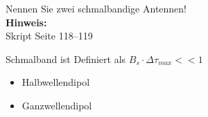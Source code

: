 \begin{question}[section=11,name={Schmalbandantennen},difficulty=,quantity=4,type=thr,tags={20130513}]
	Nennen Sie zwei schmalbandige Antennen!
	\\ \textbf{Hinweis:}\\
	Skript Seite 118--119
\end{question}
\begin{solution}
	Schmalband ist Definiert als $B_s \cdot \Delta \tau_{max} <<1$
	\begin{itemize}
		\item{Halbwellendipol}
		\item{Ganzwellendipol}
	\end{itemize}
\end{solution}